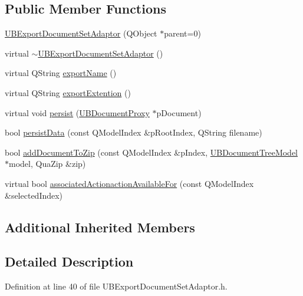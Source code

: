 \subsection*{Public Member Functions}
\begin{DoxyCompactItemize}
\item 
\hyperlink{class_u_b_export_document_set_adaptor_ad3a17f0144caa08768cc367b8d5f9161}{U\-B\-Export\-Document\-Set\-Adaptor} (Q\-Object $\ast$parent=0)
\item 
virtual \hyperlink{class_u_b_export_document_set_adaptor_a12abe9901f1ddce88abfc02bb2d7ed8c}{$\sim$\-U\-B\-Export\-Document\-Set\-Adaptor} ()
\item 
virtual Q\-String \hyperlink{class_u_b_export_document_set_adaptor_aeb5914aa1cd1350ccab1057394e20745}{export\-Name} ()
\item 
virtual Q\-String \hyperlink{class_u_b_export_document_set_adaptor_a039f9e8bce043f66f4dc0c787b305271}{export\-Extention} ()
\item 
virtual void \hyperlink{class_u_b_export_document_set_adaptor_af3a78eb86e3071bd91924e8d056a0823}{persist} (\hyperlink{class_u_b_document_proxy}{U\-B\-Document\-Proxy} $\ast$p\-Document)
\item 
bool \hyperlink{class_u_b_export_document_set_adaptor_a058f0d8ec19fe99785554e6f77660ac5}{persist\-Data} (const Q\-Model\-Index \&p\-Root\-Index, Q\-String filename)
\item 
bool \hyperlink{class_u_b_export_document_set_adaptor_a33abb3a9ff6a49a7ee38903abac857ef}{add\-Document\-To\-Zip} (const Q\-Model\-Index \&p\-Index, \hyperlink{class_u_b_document_tree_model}{U\-B\-Document\-Tree\-Model} $\ast$model, Qua\-Zip \&zip)
\item 
virtual bool \hyperlink{class_u_b_export_document_set_adaptor_aa126d3d7d8045a6bb9aa64b634872494}{associated\-Actionaction\-Available\-For} (const Q\-Model\-Index \&selected\-Index)
\end{DoxyCompactItemize}
\subsection*{Additional Inherited Members}


\subsection{Detailed Description}


Definition at line 40 of file U\-B\-Export\-Document\-Set\-Adaptor.\-h.



